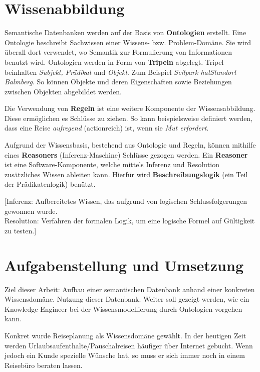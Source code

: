 \documentclass[
    paper=a4,               %
    fontsize=10pt,          %
    open=right,             %
    titlepage=false,        %
    parskip=half,           %
]{scrreprt}                 %
\begin{document}
    \begin{multicols}{3}
        \section*{Wissenabbildung}
        Semantische Datenbanken werden auf der Basis von \textbf{Ontologien} erstellt. Eine Ontologie beschreibt Sachwissen einer Wissens- bzw. Problem-Domäne. Sie wird überall dort verwendet, wo Semantik zur Formulierung von Informationen benutzt wird. Ontologien werden in Form von \textbf{Tripeln} abgelegt. Tripel beinhalten \textit{Subjekt, Prädikat} und \textit{Objekt}. Zum Beispiel \textit{Seilpark hatStandort Balmberg}. So können Objekte und deren Eigenschaften sowie Beziehungen zwischen Objekten abgebildet werden.

        Die Verwendung von \textbf{Regeln} ist eine weitere Komponente der Wissensabbildung. Diese ermöglichen es Schlüsse zu ziehen. So kann beispielsweise definiert werden, dass eine Reise \textit{aufregend} (actionreich) ist, wenn sie \textit{Mut erfordert}.

        Aufgrund der Wissensbasis, bestehend aus Ontologie und Regeln, können mithilfe eines \textbf{Reasoners} (Inferenz-Maschine) Schlüsse gezogen werden.
        Ein \textbf{Reasoner} ist eine Software-Komponente, welche mittels Inferenz und Resolution zusätzliches Wissen ableiten kann. Hierfür wird \textbf{Beschreibungslogik} (ein Teil der Prädikatenlogik) benützt.

        {[}Inferenz: Aufbereitetes Wissen, das aufgrund von logischen Schlussfolgerungen gewonnen wurde.\\
        Resolution: Verfahren der formalen Logik, um eine logische Formel auf Gültigkeit zu testen.{]}

        \section*{Aufgabenstellung und Umsetzung}
        Ziel dieser Arbeit:  Aufbau einer semantischen Datenbank anhand einer konkreten Wissensdomäne.  Nutzung dieser Datenbank. Weiter soll gezeigt werden, wie ein Knowledge Engineer bei der Wissensmodellierung durch Ontologien vorgehen kann.

        Konkret wurde Reiseplanung als Wissensdomäne gewählt. In der heutigen Zeit werden Urlaubsaufenthalte/Pauschalreisen häufiger über Internet gebucht. Wenn jedoch ein Kunde spezielle Wünsche hat, so muss er sich immer noch in einem Reisebüro beraten lassen. 


\end{multicols}
\end{document}
